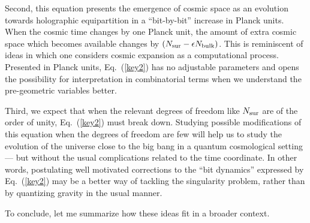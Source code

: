 \documentclass[aps,prd,showpacs,nofootinbib,floats,floatfix,preprintnumbers,groupedaddress,twocolumn]{revtex4}
\def\eq#1{{Eq.~(\ref{#1})}}
\begin{document}
Second, this equation presents the emergence of cosmic space as an evolution towards holographic equipartition in a ``bit-by-bit'' increase in Planck units. When the cosmic time changes by one Planck unit, the amount of extra cosmic space which becomes available changes by $(N_{\rm sur} - \epsilon N_{\rm bulk})$. This is reminiscent of ideas in which one considers cosmic expansion as a computational process. Presented in Planck units, \eq{key2} has no adjustable parameters and opens the possibility for interpretation in combinatorial terms when we understand the pre-geometric variables better. 


Third, we expect that when the relevant degrees of freedom like $N_{\rm sur}$ are of the order of unity, \eq{key2} must break down. Studying possible modifications of this equation when the degrees of freedom are few will help us to study the evolution of the universe close to the big bang in a quantum cosmological setting --- but without the usual complications related to the time coordinate. In other words, postulating well motivated corrections to the ``bit dynamics'' expressed by \eq{key2} may be a better way of tackling the singularity problem, rather than by quantizing gravity in the usual manner. 




To conclude, let me summarize how these ideas fit in a broader context. 
\end{document}
